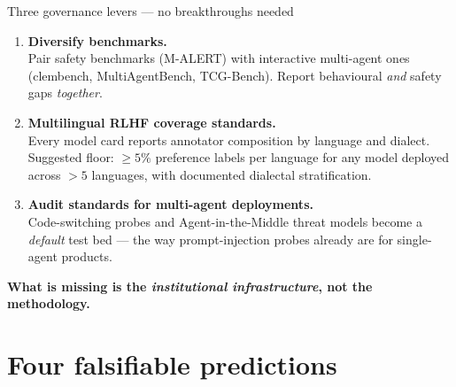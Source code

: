 \documentclass[11pt,aspectratio=169]{beamer}
\newcommand{\takeaway}[1]{%
  \begin{center}
    \colorbox{rsnavy!10}{%
      \begin{minipage}{0.92\textwidth}
        \centering\textbf{#1}
      \end{minipage}}
  \end{center}}
\begin{document}
\begin{frame}{Three governance levers --- no breakthroughs needed}
    \large
    \begin{enumerate}
        \setlength\itemsep{0.5em}
        \item \textbf{Diversify benchmarks.}\\
        \normalsize Pair safety benchmarks (M-ALERT) with interactive multi-agent ones (clembench, MultiAgentBench, TCG-Bench). Report behavioural \emph{and} safety gaps \emph{together}.

        \item \textbf{Multilingual RLHF coverage standards.}\\
        \normalsize Every model card reports annotator composition by language and dialect. Suggested floor: $\geq 5\%$ preference labels per language for any model deployed across $> 5$ languages, with documented dialectal stratification.

        \item \textbf{Audit standards for multi-agent deployments.}\\
        \normalsize Code-switching probes and Agent-in-the-Middle threat models become a \emph{default} test bed --- the way prompt-injection probes already are for single-agent products.
    \end{enumerate}
    \vspace{0.3cm}
    \takeaway{What is missing is the \emph{institutional infrastructure}, not the methodology.}
\end{frame}

\section{Four falsifiable predictions}
\end{document}

